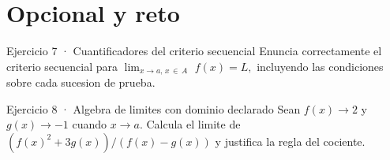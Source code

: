 \documentclass[10pt,a4paper,oneside,openany]{book}
\begin{document}
\section*{Opcional y reto}
\begin{PSevenOptionalFixed}{Ejercicio 7 · Cuantificadores del criterio secuencial}
Enuncia correctamente el criterio secuencial para \(\lim_{x\to a,\,x\,\in \,A}\) \(f(x)=L,\) incluyendo las condiciones sobre cada sucesion de prueba.
\end{PSevenOptionalFixed}
\begin{PSevenOptionalFixed}{Ejercicio 8 · Algebra de limites con dominio declarado}
Sean \(f(x)\to 2\) y \(g(x)\to -1\) cuando \(x\to a\). Calcula el limite de \((f(x)^{2}+3g(x))/(f(x)-g(x))\) y justifica la regla del cociente.
\end{PSevenOptionalFixed}
\end{document}
